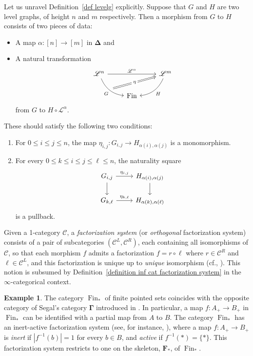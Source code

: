 \documentclass{amsart}
\numberwithin{theorem}{subsection}
\theoremstyle{definition}
\newtheorem{example}[theorem]{Example}
\newcommand{\finset}{\operatorname{Fin}}
\newcommand{\pfinset}{\finset_*}
\newcommand{\finsetskel}{\mathbf{F}}
\newcommand{\pfinsetskel}{\finsetskel_*}
\newcommand{\xcc}{\mathcal{C}}
\newcommand{\simp}{\mathbf{\Delta}}
\newcommand{\segalGamma}{\mathbf{\Gamma}}
\newcommand{\scriptyell}{\mathscr L}
\begin{document}
Let us unravel Definition~\ref{def levelg} explicitly.
Suppose that $G$ and $H$ are two level graphs, of height $n$ and $m$ respectively.
Then a morphism from $G$ to $H$ consists of two pieces of data:
	\begin{itemize}
		\item A map $ \alpha \colon [n]\to [m]$ in $\simp$ and
		\item A natural transformation
		\[ \begin{tikzcd}
		\scriptyell^n  \arrow[rr, "\scriptyell^\alpha"] \arrow[dr, bend right, "G" swap, ""{name=B%
		}]  & & \scriptyell^m \arrow[Rightarrow, from=B, "\eta" description] \arrow[dl, bend left, "H"]\\
		 & \finset
		\end{tikzcd} \]
		from $G$ to $H \circ \scriptyell^{\alpha}$.
	\end{itemize}
These should satisfy the following two conditions:
\begin{enumerate}
 	\item For $0 \leq i \leq j \leq n$, the map $\eta_{i,j} \colon G_{i,j} \to H_{\alpha(i),\alpha(j)}$ is a monomorphism.
 	\item For every $0\leq k\leq i\leq j\leq \ell\leq n$, the naturality square
		\begin{equation*}
		\begin{tikzcd}
		G_{i,j}\ar[r,"\eta_{i,j}"] \ar{d}& H_{\alpha(i),\alpha(j)}\ar {d}\\
		G_{k,\ell}\ar[r,"\eta_{k,\ell}"] & H_{\alpha(k),\alpha(\ell)}
		\end{tikzcd}
		\end{equation*}
		is a pullback.
 \end{enumerate}

Given a 1-category $\xcc$, a \emph{factorization system} (or \emph{orthogonal} factorization system) consists of a pair of subcategories $(\xcc^L, \xcc^R)$, each containing all isomorphisms of $\xcc$, so that each morphism $f$ admits a factorization $f = r\circ \ell$ where $r\in \xcc^R$ and $\ell \in \xcc^L$, and this factorization is unique up to \emph{unique} isomorphism (cf., \cite[Proposition 14.7]{AdamekHerrlichStrecker:ACCJC}).
This notion is subsumed by Definition~\ref{definition inf cat factorization system} in the $\infty$-categorical context.

\begin{example}\label{ex: bbG}
The category $\pfinset$ of finite pointed sets coincides with the opposite category of Segal's category $\segalGamma$ introduced in \cite[Definition 1.1]{SegalCatCohlgy}. 
In particular, a map $f\colon A_+\to B_+$ in $\pfinset$ can be identified with a partial map from $A$ to $B$. 
The category $\pfinset$ has an inert-active factorization system (see, for instance, \cite[Remark 2.1.2.2]{ha}), where a map $f\colon A_+\to B_+$ is \emph{inert} if $|f^{-1}(b)|=1$ for every $b\in B$, and \emph{active} if $f^{-1}(*)= \{*\}$. 
This factorization system restricts to one on the skeleton, $\pfinsetskel$, of $\pfinset$.
\end{example}
\end{document}

